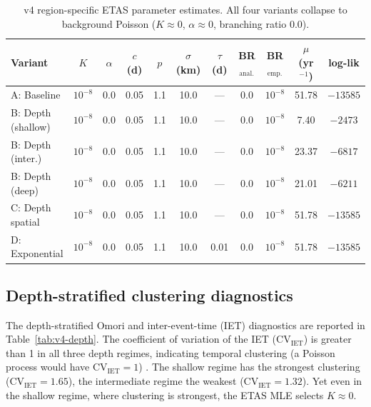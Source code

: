 \documentclass[10pt,a4paper,twocolumn]{article}
\begin{document}
\begin{table}[t]
\centering
\caption{v4 region-specific ETAS parameter estimates. All four variants collapse to background Poisson ($K\approx0$, $\alpha\approx0$, branching ratio 0.0).}\label{tab:v4-params}
\small
\begin{tabular*}{\textwidth}{@{\extracolsep{\fill}}lcccccccccc}
\toprule
Variant & $K$ & $\alpha$ & $c$ (d) & $p$ & $\sigma$ (km) & $\tau$ (d) & BR$_{\text{anal.}}$ & BR$_{\text{emp.}}$ & $\mu$ (yr$^{-1}$) & log-lik \\
\midrule
A: Baseline         & $10^{-8}$ & 0.0 & 0.05 & 1.1 & 10.0 & --- & 0.0 & $10^{-8}$ & 51.78 & $-13585$ \\
B: Depth (shallow)  & $10^{-8}$ & 0.0 & 0.05 & 1.1 & 10.0 & --- & 0.0 & $10^{-8}$ & 7.40  & $-2473$ \\
B: Depth (inter.)   & $10^{-8}$ & 0.0 & 0.05 & 1.1 & 10.0 & --- & 0.0 & $10^{-8}$ & 23.37 & $-6817$ \\
B: Depth (deep)     & $10^{-8}$ & 0.0 & 0.05 & 1.1 & 10.0 & --- & 0.0 & $10^{-8}$ & 21.01 & $-6211$ \\
C: Depth spatial    & $10^{-8}$ & 0.0 & 0.05 & 1.1 & 10.0 & --- & 0.0 & $10^{-8}$ & 51.78 & $-13585$ \\
D: Exponential      & $10^{-8}$ & 0.0 & 0.05 & 1.1 & 10.0 & 0.01 & 0.0 & $10^{-8}$ & 51.78 & $-13585$ \\
\bottomrule
\end{tabular*}
\end{table}

\subsection{Depth-stratified clustering diagnostics}

The depth-stratified Omori and inter-event-time (IET) diagnostics are reported in Table~\ref{tab:v4-depth}. The coefficient of variation of the IET (CV$_{\text{IET}}$) is greater than 1 in all three depth regimes, indicating temporal clustering (a Poisson process would have CV$_{\text{IET}}=1$) \cite{heuer2012}. The shallow regime has the strongest clustering (CV$_{\text{IET}}=1.65$), the intermediate regime the weakest (CV$_{\text{IET}}=1.32$). Yet even in the shallow regime, where clustering is strongest, the ETAS MLE selects $K\approx0$.
\end{document}

